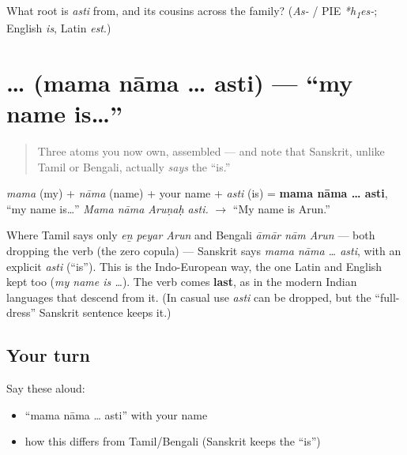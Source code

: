 \begin{tcolorbox}[breakable,colback=teal!4,colframe=teal!35!black,title={Before you move on}]
What root is \emph{asti} from, and its cousins across the family? (\emph{As-} / PIE \emph{*h\textsubscript{1}es-}; English \emph{is}, Latin \emph{est}.)
\end{tcolorbox}
\section[\texorpdfstring{\sk{मम} \sk{नाम} … \sk{अस्ति} (mama nāma … asti)}{मम नाम … अस्ति (mama nāma … asti)}]{  …  (mama nāma … asti) — \textquotedblleft{}my name is…\textquotedblright{}}

\label{lesson:SA-C02-mama-nama-asti}



\begin{quote}
Three atoms you now own, assembled — and note that Sanskrit, unlike Tamil or Bengali, actually \emph{says} the \textquotedblleft{}is.\textquotedblright{}
\end{quote}

\begin{cousinweb}
\emph{mama} (my) + \emph{nāma} (name) + your name + \emph{asti} (is) = \textbf{mama nāma … asti}, \textquotedblleft{}my name is…\textquotedblright{} \emph{Mama nāma Aruṇaḥ asti.} $\to$ \textquotedblleft{}My name is Arun.\textquotedblright{}
\end{cousinweb}

\begin{grammarlens}[title={Grammar Lens: Sanskrit keeps the \textquotedblleft{}is\textquotedblright{}}]
Where Tamil says only \emph{eṉ peyar Arun} and Bengali \emph{āmār nām Arun} — both dropping the verb (the zero copula) — Sanskrit says \emph{mama nāma … asti}, with an explicit \emph{asti} (\textquotedblleft{}is\textquotedblright{}). This is the Indo-European way, the one Latin and English kept too (\emph{my name is …}). The verb comes \textbf{last}, as in the modern Indian languages that descend from it. (In casual use \emph{asti} can be dropped, but the \textquotedblleft{}full-dress\textquotedblright{} Sanskrit sentence keeps it.)
\end{grammarlens}

\subsection*{Your turn}
Say these aloud:

\begin{itemize}
\raggedright
  \item \textquotedblleft{}mama nāma … asti\textquotedblright{} with your name
  \item how this differs from Tamil/Bengali (Sanskrit keeps the \textquotedblleft{}is\textquotedblright{})
\end{itemize}

